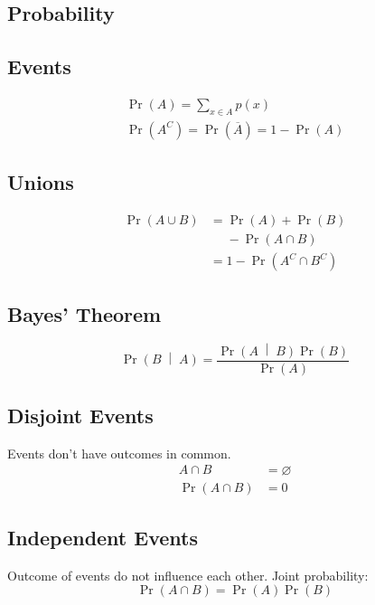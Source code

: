 \documentclass{article}
\begin{document}
\begin{multicols}{3}
    \section*{Probability}
    \subsection*{Events}
    \begin{gather*}
        \Pr{\left( A \right)} = \sum_{x\in A} p(x) \\
        \Pr{\left( A^C \right)} = \Pr{\left( \overline{A} \right)} = 1 - \Pr{\left( A \right)}
    \end{gather*}
    \subsection*{Unions}
    \begin{align*}
        \Pr{\left( A \cup B \right)} & = \Pr{\left( A \right)} + \Pr{\left( B \right)} \\
                                     & \phantom{=} - \Pr{\left( A \cap B \right)}      \\
                                     & = 1 - \Pr{\left( A^C \cap B^C \right)}
    \end{align*}
    \subsection*{Bayes' Theorem}
    \begin{equation*}
        \Pr{\left(B \;\middle|\; A\right)} = \frac{\Pr{\left( A \;\middle|\; B \right)}\Pr{\left( B \right)}}{\Pr{\left( A \right)}}
    \end{equation*}
    \subsection*{Disjoint Events}
    Events don't have outcomes in common.
    \begin{align*}
        A \cap B                   & = \varnothing \\
        \Pr{\left(A \cap B\right)} & = 0
    \end{align*}
    \subsection*{Independent Events}
    Outcome of events do not influence each other. Joint probability:
    \begin{equation*}
        \Pr{\left(A \cap B\right)} = \Pr{\left( A \right)}\Pr{\left( B \right)}
    \end{equation*}

\end{multicols}
\end{document}
